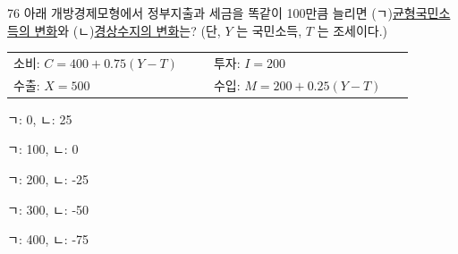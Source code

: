 \begin{question}{76}
아래 개방경제모형에서 정부지출과 세금을 똑같이 100만큼 늘리면 (ㄱ)\uline{균형국민소득의 변화}와 (ㄴ)\uline{경상수지의 변화}는? (단, $Y$ 는 국민소득, $T$ 는 조세이다.)
\begin{framedtext}
\begin{tabular}{@{}p{0.45\linewidth}p{0.45\linewidth}@{}}
소비: $C=400+0.75(Y-T)$ & 투자: $I=200$ \\
수출: $X=500$ & 수입: $M=200+0.25(Y-T)$
\end{tabular}
\end{framedtext}
\begin{choices}
  \item ㄱ: 0, ㄴ: 25
  \item ㄱ: 100, ㄴ: 0
  \item ㄱ: 200, ㄴ: -25
  \item ㄱ: 300, ㄴ: -50
  \item ㄱ: 400, ㄴ: -75
\end{choices}
\end{question}
